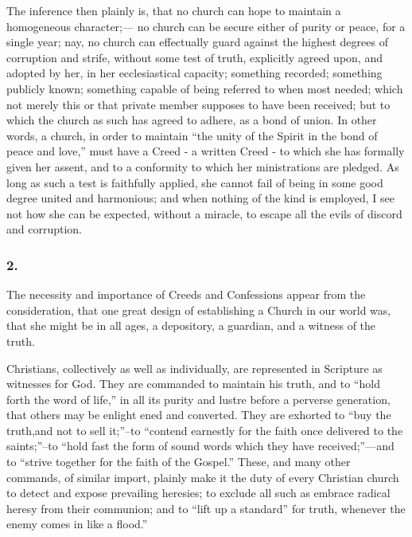 \documentclass[
]{book}
\begin{document}
The inference then plainly is, that no church can hope to maintain a homogeneous character;--- no church can be secure either of purity or peace, for a single year; nay, no church can effectually guard against the highest degrees of corruption and strife, without some test of truth, explicitly agreed upon, and adopted by her, in her ecclesiastical capacity; something recorded; something publicly known; something capable of being referred to when most needed; which not merely this or that private member supposes to have been received; but to which the church as such has agreed to adhere, as a bond of union. In other words, a church, in order to maintain ``the unity of the Spirit in the bond of peace and love,'' must have a Creed - a written Creed - to which she has formally given her assent, and to a conformity to which her ministrations are pledged. As long as such a test is faithfully applied, she cannot fail of being in some good degree united and harmonious; and when nothing of the kind is employed, I see not how she can be expected, without a miracle, to escape all the evils of discord and corruption.

\hypertarget{section-1}{%
\subsubsection*{2.}\label{section-1}}

The necessity and importance of Creeds and Confessions appear from the consideration, that one great design of establishing a Church in our world was, that she might be in all ages, a depository, a guardian, and a witness of the truth.

Christians, collectively as well as individually, are represented in Scripture as witnesses for God. They are commanded to maintain his truth, and to ``hold forth the word of life,'' in all its purity and lustre before a perverse generation, that others may be enlight ened and converted. They are exhorted to ``buy the truth,and not to sell it;''--to ``contend earnestly for the faith once delivered to the saints;''--to ``hold fast the form of sound words which they have received;''---and to ``strive together for the faith of the Gospel.'' These, and many other commands, of similar import, plainly make it the duty of every Christian church to detect and expose prevailing heresies; to exclude all such as embrace radical heresy from their communion; and to ``lift up a standard'' for truth, whenever the enemy comes in like a flood.''
\end{document}
